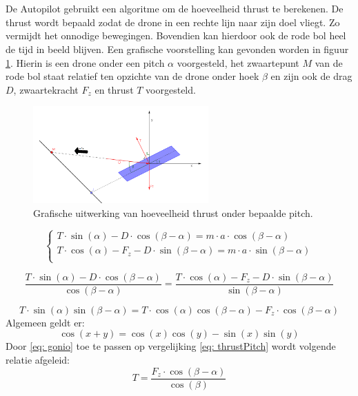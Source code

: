 \\
\\
De Autopilot gebruikt een algoritme om de hoeveelheid thrust te berekenen. De thrust wordt bepaald zodat de drone in een rechte lijn naar zijn doel vliegt. Zo vermijdt het onnodige bewegingen. Bovendien kan hierdoor ook de rode bol heel de tijd in beeld blijven. Een grafische voorstelling kan gevonden worden in figuur \ref{fig:GrafischeUitwerkingVanHoeveelheidThrustOnderBepaaldePitch}. Hierin is een drone onder een pitch \(\alpha\) voorgesteld, het zwaartepunt \(M\) van de rode bol staat relatief ten opzichte van de drone onder hoek \(\beta\) en zijn ook de drag \(D\), zwaartekracht \(F_z\) en thrust \(T\) voorgesteld.

\begin{figure}[h]
	\centering
	\includegraphics[width=0.6\textwidth]{GrafischeUitwerkingVanHoeveelheidThrustOnderBepaaldePitch.png}
	\caption{Grafische uitwerking van hoeveelheid thrust onder bepaalde pitch.}
	\label{fig:GrafischeUitwerkingVanHoeveelheidThrustOnderBepaaldePitch}
\end{figure}

\begin{equation}
\begin{cases}
T\cdot\sin(\alpha)-D\cdot\cos(\beta-\alpha) = m\cdot a\cdot\cos(\beta-\alpha)\\
T\cdot\cos(\alpha) - F_z - D\cdot\sin(\beta-\alpha) = m\cdot a\cdot\sin(\beta-\alpha)\\
\end{cases}
\end{equation}

\begin{equation}
\frac{T\cdot\sin(\alpha)-D\cdot\cos(\beta-\alpha)}{\cos(\beta-\alpha)} = \frac{T\cdot\cos(\alpha) - F_z - D\cdot\sin(\beta-\alpha)}{\sin(\beta-\alpha)}
\end{equation}

\begin{equation} \label{eq: thrustPitch}
T\cdot\sin(\alpha)\sin(\beta-\alpha) = T\cdot\cos(\alpha)\cos(\beta-\alpha)- F_z\cdot\cos(\beta-\alpha)
\end{equation}
Algemeen geldt er:
\begin{equation} \label{eq: gonio}
\cos(x+y) = \cos(x)\cos(y)-\sin(x)\sin(y)
\end{equation}
Door \ref{eq: gonio} toe te passen op vergelijking \ref{eq: thrustPitch} wordt volgende relatie afgeleid:
\begin{equation}
T = \frac{ F_z\cdot\cos(\beta-\alpha)}{\cos(\beta)}
\end{equation}

